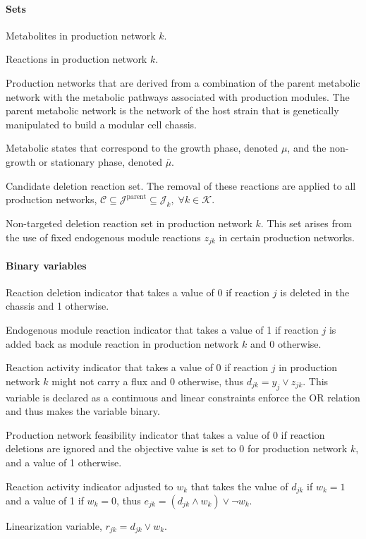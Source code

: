 \paragraph{Sets}
\begin{description}[leftmargin=1.5cm, style=nextline, itemindent=-10pt]
\item[$\mathcal{I}_k$] Metabolites in production network $k$.
\item[$\mathcal{J}_k$] Reactions in production network $k$.
\item[$\mathcal{K}$]  Production networks that are derived from a combination of the parent metabolic network with the metabolic pathways associated with production modules. The parent metabolic network is the network of the host strain that is genetically manipulated to build a modular cell chassis.
\item[$\mathcal{M}$] Metabolic states that correspond to the growth phase, denoted $\mu$, and the non-growth or stationary phase, denoted $\bar{\mu}$.
\item[$\mathcal{C}$] Candidate deletion reaction set. The removal of these reactions are applied to all production networks, $\mathcal{C} \subseteq \mathcal{J}^{\textrm{parent}} \subseteq \mathcal{J}_k, \; \forall k \in \mathcal{K}$.
\item[$\mathcal{N}_k$] Non-targeted deletion reaction set in production network $k$. This set arises from the use of fixed endogenous module reactions $z_{jk}$ in certain production networks.
\end{description}

\paragraph{Binary variables}
\begin{description}[leftmargin=1.5cm, style=nextline, itemindent=-10pt]
\item[$y_j$] Reaction deletion indicator that takes a value of 0 if reaction $j$ is deleted in the chassis and 1 otherwise.
\item[$z_{jk}$] Endogenous module reaction indicator that takes a value of 1 if reaction $j$ is added back as module reaction in production network $k$ and 0 otherwise.
\item[$d_{jk}$] Reaction activity indicator that takes a value of 0 if reaction $j$ in production network $k$ might not carry a flux and 0 otherwise, thus $d_{jk} = y_j \lor z_{jk}$. This variable is declared as a continuous and linear constraints enforce the OR relation and thus makes the variable binary.
\item[$w_k$] Production network feasibility indicator that takes a value of 0 if reaction deletions are ignored and the objective value is set to 0 for production network $k$, and a value of  1 otherwise.
\item[$e_{jk}$]  Reaction activity indicator adjusted to $w_k$ that takes the value of $d_{jk}$ if $w_k=1$ and a value of 1 if $w_k=0$, thus $e_{jk}=(d_{jk}\land w_k) \lor \lnot w_k$.
\item[$r_{jk}$] Linearization variable, $r_{jk} = d_{jk} \lor w_k.$
\end{description}

